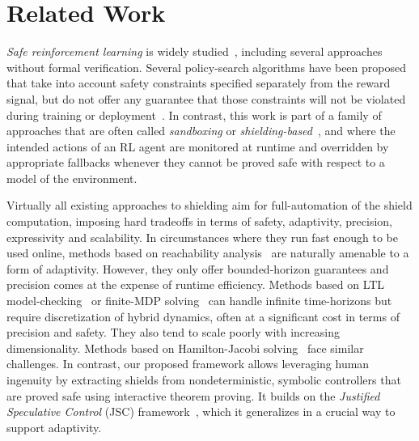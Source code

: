 \section{Related Work}
\emph{Safe reinforcement learning} is widely studied~\cite{DBLP:journals/corr/abs-2205-10330,DBLP:journals/jmlr/GarciaF15,brunke2022safe}, including several approaches without formal verification. Several policy-search algorithms have been proposed that take into account safety constraints specified separately from the reward signal, but do not offer any guarantee that those constraints will not be violated during training or deployment~\cite{DBLP:conf/icml/AchiamHTA17,DBLP:conf/aaai/YangSTS21,DBLP:conf/iclr/TesslerMM19}. In contrast, this work is part of a family of approaches that are often called \emph{sandboxing} or \emph{shielding-based}~\cite{DBLP:conf/aaai/AlshiekhBEKNT18,DBLP:conf/aaai/FultonP18,DBLP:conf/icra/ThummA22}, and where the intended actions of an RL agent are monitored at runtime and overridden by appropriate fallbacks whenever they cannot be proved safe with respect to a model of the environment.

Virtually all existing approaches to shielding aim for full-automation of the shield computation, imposing hard tradeoffs in terms of safety, adaptivity, precision, expressivity and scalability. In circumstances where they run fast enough to be used online, methods based on reachability analysis~\cite{DBLP:conf/icra/ThummA22,DBLP:conf/cdc/KollerBT018,ivanov2019verisig} are naturally amenable to a form of adaptivity. However, they only offer bounded-horizon guarantees and precision comes at the expense of runtime efficiency. Methods based on LTL model-checking~\cite{DBLP:conf/aaai/AlshiekhBEKNT18,DBLP:conf/isola/KonighoferL0B20} or finite-MDP solving~\cite{pranger2021adaptive} can handle infinite time-horizons but require discretization of hybrid dynamics, often at a significant cost in terms of precision and safety. They also tend to scale poorly with increasing dimensionality. Methods based on Hamilton-Jacobi solving~\cite{DBLP:journals/tac/FisacAZKGT19} face similar challenges. In contrast, our proposed framework allows leveraging human ingenuity by extracting shields from nondeterministic, symbolic controllers that are proved safe using interactive theorem proving. It builds on the \emph{Justified Speculative Control} (JSC) framework~\cite{DBLP:conf/aaai/FultonP18}, which it generalizes in a crucial way to support adaptivity.

